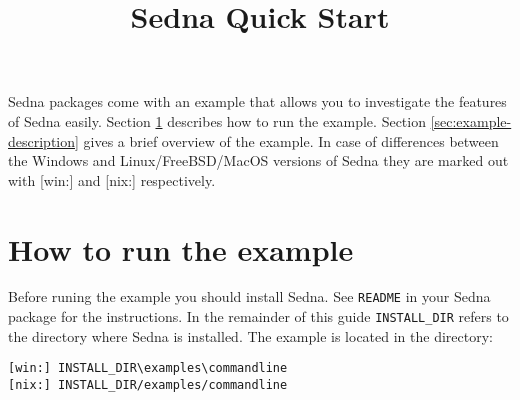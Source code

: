 \documentclass[a4paper,12pt]{article}
\title{Sedna Quick Start}
\date{}
\begin{document}
\sloppy

\maketitle

Sedna packages come with an example that allows you to investigate the features of Sedna easily. 
Section \ref{sec:how-to-run} describes how to run the example. Section \ref{sec:example-description} gives a brief overview of the example. In case of differences between the Windows and Linux/FreeBSD/MacOS versions of Sedna they are marked out with [win:] and [nix:] respectively.

\section{How to run the example}
\label{sec:how-to-run}
Before runing the example you should install Sedna. See \verb!README! in your Sedna package for the instructions.
In the remainder of this guide \verb!INSTALL_DIR! refers to the directory where Sedna is installed.  
The example is located in the directory:

\begin{verbatim}
[win:] INSTALL_DIR\examples\commandline
[nix:] INSTALL_DIR/examples/commandline
\end{verbatim}
\end{document}
